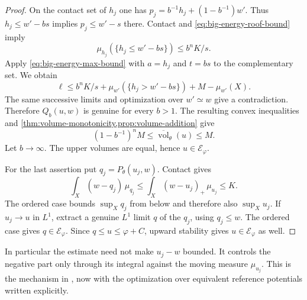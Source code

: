 \begin{proof}
On the contact set of $h_j$ one has
$p_j=b^{-1}h_j+(1-b^{-1})w'$. Thus $h_j\leq w'-bs$ implies $p_j\leq w'-s$ there. Contact and \eqref{eq:big-energy-roof-bound} imply
\[
 \mu_{h_j}(\{h_j\leq w'-bs\})\leq b^nK/s.
\]
Apply \eqref{eq:big-energy-max-bound} with $a=h_j$ and $t=bs$ to the complementary set. We obtain
\[
 \ell\leq b^nK/s+
     \mu_{w'}(\{h_j>w'-bs\})+M-\mu_{w'}(X).
\]
The same successive limits and optimization over $w'\simeq w$ give a contradiction. Therefore $Q_b(u,w)$ is genuine for every $b>1$. The resulting convex inequalities and \cref{thm:volume-monotonicity,prop:volume-addition} give
\[
 (1-b^{-1})^n M\leq\overline{\operatorname{vol}}_\theta(u)\leq M.
\]
Let $b\to\infty$. The upper volumes are equal, hence $u\in\mathcal E_\varphi$.

For the last assertion put $q_j=P_\theta(u_j,w)$. Contact gives
\[
 \int_X(w-q_j)\,\mu_{q_j}
 \leq\int_X(w-u_j)_+\,\mu_{u_j}\leq K.
\]
The ordered case bounds $\sup_Xq_j$ from below and therefore also $\sup_Xu_j$. If $u_j\to u$ in $L^1$, extract a genuine $L^1$ limit $q$ of the $q_j$, using $q_j\leq w$. The ordered case gives $q\in\mathcal E_\varphi$. Since $q\leq u\leq\varphi+C$, upward stability gives $u\in\mathcal E_\varphi$ as well.
\end{proof}

In particular the estimate need not make $u_j-w$ bounded. It controls the negative part only through its integral against the moving measure $\mu_{u_j}$. This is the mechanism in \cite[Proposition 4.2]{XL26}, now with the optimization over equivalent reference potentials written explicitly.

